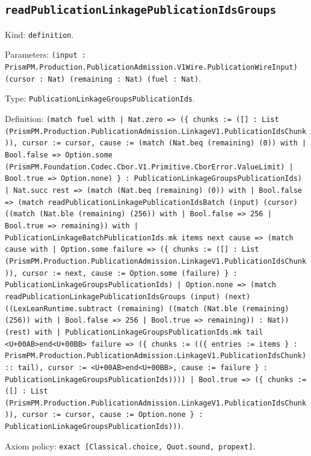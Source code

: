 \documentclass[11pt]{article}
\begin{document}
\subsection*{\texttt{readPublicationLinkagePublicationIdsGroups}}
\noindent Kind: \texttt{definition}.\par
\noindent Parameters: \texttt{(input : PrismPM.Production.PublicationAdmission.V1Wire.PublicationWireInput) (cursor : Nat) (remaining : Nat) (fuel : Nat)}.\par
\noindent Type: \texttt{PublicationLinkageGroupsPublicationIds}.\par
\noindent Definition: \texttt{(match fuel with | Nat.zero => (\{ chunks := ([] : List (PrismPM.Production.PublicationAdmission.LinkageV1.PublicationIdsChunk)), cursor := cursor, cause := (match (Nat.beq (remaining) (0)) with | Bool.false => Option.some (PrismPM.Foundation.Codec.Cbor.V1.Primitive.CborError.ValueLimit) | Bool.true => Option.none) \} : PublicationLinkageGroupsPublicationIds) | Nat.succ rest => (match (Nat.beq (remaining) (0)) with | Bool.false => (match readPublicationLinkagePublicationIdsBatch (input) (cursor) ((match (Nat.ble (remaining) (256)) with | Bool.false => 256 | Bool.true => remaining)) with | PublicationLinkageBatchPublicationIds.mk items next cause => (match cause with | Option.some failure => (\{ chunks := ([] : List (PrismPM.Production.PublicationAdmission.LinkageV1.PublicationIdsChunk)), cursor := next, cause := Option.some (failure) \} : PublicationLinkageGroupsPublicationIds) | Option.none => (match readPublicationLinkagePublicationIdsGroups (input) (next) ((LexLeanRuntime.subtract (remaining) ((match (Nat.ble (remaining) (256)) with | Bool.false => 256 | Bool.true => remaining)) : Nat)) (rest) with | PublicationLinkageGroupsPublicationIds.mk tail <U+00AB>end<U+00BB> failure => (\{ chunks := ((\{ entries := items \} : PrismPM.Production.PublicationAdmission.LinkageV1.PublicationIdsChunk) :: tail), cursor := <U+00AB>end<U+00BB>, cause := failure \} : PublicationLinkageGroupsPublicationIds)))) | Bool.true => (\{ chunks := ([] : List (PrismPM.Production.PublicationAdmission.LinkageV1.PublicationIdsChunk)), cursor := cursor, cause := Option.none \} : PublicationLinkageGroupsPublicationIds)))}.\par
\noindent Axiom policy: \texttt{exact [Classical.choice, Quot.sound, propext]}.\par
\end{document}

